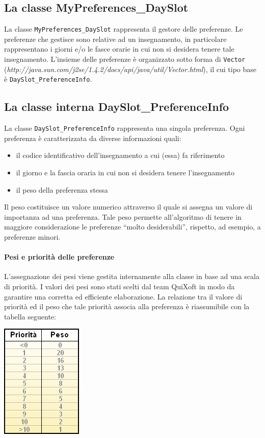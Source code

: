 \documentclass[11pt,a4paper]{article}
\begin{document}
\subsection*{La classe MyPreferences\_DaySlot}
La classe \verb|MyPreferences_DaySlot| rappresenta il gestore delle preferenze. Le preferenze che gestisce sono relative ad un insegnamento, in particolare rappresentano i giorni e/o le fasce orarie in cui non si desidera tenere tale insegnamento.
L'insieme delle preferenze è organizzato sotto forma di \verb|Vector| (\textit{http://java.sun.com/j2se/1.4.2/docs/api/java/util/Vector.html}), il cui tipo base è \verb|DaySlot_PreferenceInfo|.
\subsection*{La classe interna DaySlot\_PreferenceInfo}
La classe \verb|DaySlot_PreferenceInfo| rappresenta una singola preferenza. Ogni preferenza è caratterizzata da diverse informazioni quali:
\begin{itemize}
\item	il codice identificativo dell'insegnamento a cui (essa) fa riferimento
\item	il giorno e la fascia oraria in cui non si desidera tenere l'insegnamento
\item	il peso della preferenza stessa
\end{itemize}
Il peso costituisce un valore numerico attraverso il quale si assegna un valore di importanza ad una preferenza. Tale peso permette all'algoritmo di tenere in maggiore considerazione le preferenze ``molto desiderabili'', rispetto, ad esempio, a preferenze minori.

\paragraph{Pesi e priorità delle preferenze}
L'assegnazione dei pesi viene gestita internamente alla classe in base ad una scala di priorità. I valori dei pesi sono stati scelti dal team QuiXoft in modo da garantire una corretta ed efficiente elaborazione. La relazione tra il valore di priorità ed il peso che tale priorità associa alla preferenza è riassumibile con la tabella seguente:

\begin{center}
 \includegraphics[scale=0.8]{images/Algoritm_WeightPriorityRelation.png}
\end{center}
\end{document}

